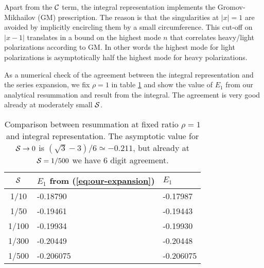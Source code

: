 Apart from the $\mathcal C$ term, the integral representation implements the Gromov-Mikhailov (GM) prescription. The reason is that the singularities at $|x|=1$ are avoided by implicitly encircling them by a small circumference. This cut-off on $|x-1|$ translates in a bound on the highest mode $n$ that correlates heavy/light polarizations according to GM. In other words the highest mode for light polarizations is asymptotically half the highest mode for heavy polarizations. 

As a numerical check of the agreement between the integral representation and the series expansion, 
we fix $\rho=1$ in table \ref{tab:check1} and show
the value of $E_{1}$ from our analytical resummation and result from the integral. The agreement is very good already 
at moderately small $\mathcal S$.

\begin{table}[htb]
\begin{center}
\begin{tabular}{c|ll}
$\mathcal S$ & $E_{1}$ from (\ref{eq:our-expansion}) & $E_{1}$ \\
\hline
1/10 & -0.18790 & -0.17987  \\
1/50 & -0.19461 & -0.19443 \\
1/100 & -0.19934 & -0.19930 \\
1/300 & -0.20449 & -0.20448 \\
1/500 & -0.206075 & -0.206075
\end{tabular}
\caption{Comparison between resummation at fixed ratio
$\rho=1$ and integral representation. The asymptotic value for $\mathcal S\to 0$ is $(\sqrt 3-3)/6\simeq -0.211$, but already at $\mathcal S = 1/500$ we have 6 digit agreement.
}
\label{tab:check1}
\end{center}
\end{table}



